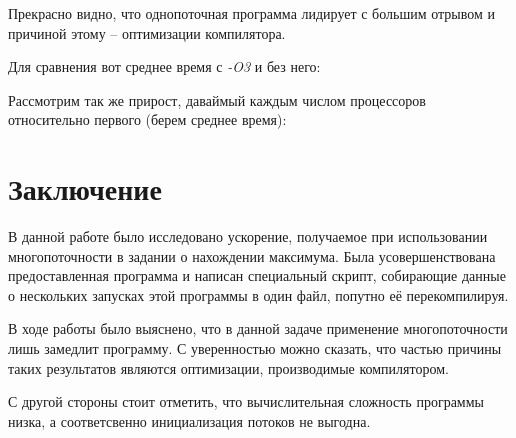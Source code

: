 \documentclass[a4paper, 12pt]{article}
\begin{document}
Прекрасно видно, что однопоточная программа лидирует с большим отрывом и причиной этому -- оптимизации компилятора.

Для сравнения вот среднее время с \textit{-O3} и без него:

\vspace{0.3cm}


\vspace{0.3cm}

Рассмотрим так же прирост, даваймый каждым числом процессоров относительно первого (берем среднее время):



\section{Заключение}
В данной работе было исследовано ускорение, получаемое при использовании многопоточности в задании о нахождении максимума. Была усовершенствована предоставленная программа и написан специальный скрипт, собирающие данные о нескольких запусках этой программы в один файл, попутно её перекомпилируя.

В ходе работы было выяснено, что в данной задаче применение многопоточности лишь замедлит программу. С уверенностью можно сказать, что частью причины таких результатов являются оптимизации, производимые компилятором.

С другой стороны стоит отметить, что вычислительная сложность программы низка, а соответсвенно инициализация потоков не выгодна.
\end{document}
